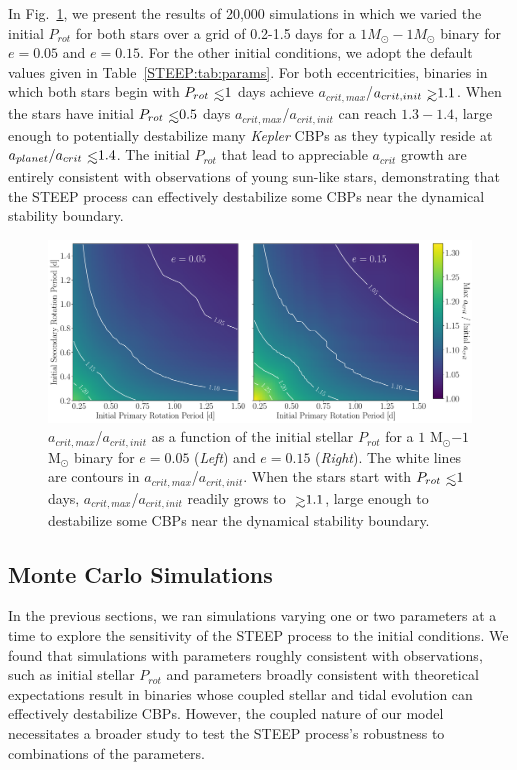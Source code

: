 In Fig.~\ref{STEEP:fig:GG_contour}, we present the results of 20,000 simulations in which we varied the initial $P_{rot}$ for both stars over a grid of 0.2-1.5 days for a $1 M_{\odot} - 1 M_{\odot}$ binary for $e=0.05$ and $e=0.15$.  For the other initial conditions, we adopt the default values given in Table~\ref{STEEP:tab:params}.  For both eccentricities, binaries in which both stars begin with $P_{rot} \lsim 1$ days achieve $a_{crit,max}$/$a_{crit,init} \gsim 1.1$.  When the stars have initial $P_{rot} \lsim 0.5$ days $a_{crit,max}$/$a_{crit,init}$ can reach $1.3-1.4$, large enough to potentially destabilize many {\it Kepler} CBPs as they typically reside at $a_{planet}/a_{crit} \lsim 1.4$.  The initial $P_{rot}$ that lead to appreciable $a_{crit}$ growth are entirely consistent with observations of young sun-like stars, demonstrating that the STEEP process can effectively destabilize some CBPs near the dynamical stability boundary.

\begin{figure}
	\includegraphics[width=\columnwidth]{GG_contour.pdf}
    \caption{$a_{crit,max}$/$a_{crit,init}$ as a function of the initial stellar $P_{rot}$ for a $1$ M$_{\odot}$$-1$ M$_{\odot}$ binary for $e = 0.05$ ({\it Left}) and $e = 0.15$ ({\it Right}).  The white lines are contours in $a_{crit,max}$/$a_{crit,init}$.  When the stars start with $P_{rot} \lsim 1$ days, $a_{crit,max}$/$a_{crit,init}$ readily grows to $\gsim 1.1$, large enough to destabilize some CBPs near the dynamical stability boundary.}
    \label{STEEP:fig:GG_contour}
\end{figure}

\subsection{Monte Carlo Simulations} \label{STEEP:sec:monte_carlo}

In the previous sections, we ran simulations varying one or two parameters at a time to explore the sensitivity of the STEEP process to the initial conditions.  We found that simulations with parameters roughly consistent with observations, such as initial stellar $P_{rot}$ and parameters broadly consistent with theoretical expectations result in binaries whose coupled stellar and tidal evolution can effectively destabilize CBPs.  However, the coupled nature of our model necessitates a broader study to test the STEEP process's robustness to combinations of the parameters.

